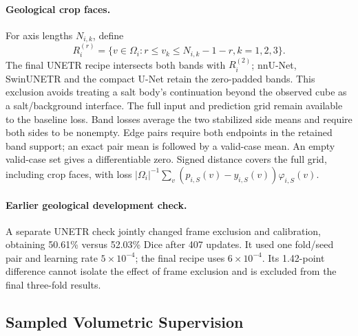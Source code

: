 \documentclass[12pt,a4paper]{article}
\begin{document}
\paragraph{Geological crop faces.}\label{sec:geo-boundaries}
For axis lengths $N_{i,k}$, define
\begin{equation}
R_i^{(r)}=\{v\in\Omega_i:r\leq v_k\leq N_{i,k}-1-r, k=1,2,3\}.
\label{eq:geological-band-frame}
\end{equation}
The final UNETR recipe intersects both bands with $R_i^{(2)}$;
nnU-Net, SwinUNETR and the compact U-Net retain the zero-padded bands.
This exclusion avoids treating a salt body's continuation beyond the
observed cube as a salt/background interface. The full input and
prediction grid remain available to the baseline loss.
Band losses average the two stabilized side means and require both
sides to be nonempty. Edge pairs require both endpoints in the retained
band support; an exact pair mean is followed by a valid-case mean.
An empty valid-case set gives a differentiable zero. Signed distance
covers the full grid, including crop faces, with loss
$|\Omega_i|^{-1}\sum_v(p_{i,S}(v)-y_{i,S}(v))\varphi_{i,S}(v)$.

\paragraph{Earlier geological development check.}\label{sec:geo-development}
A separate UNETR check jointly changed frame exclusion and calibration,
obtaining 50.61\% versus 52.03\% Dice after 407
updates. It used one fold/seed pair and learning rate $5\times10^{-4}$;
the final recipe uses $6\times10^{-4}$. Its 1.42-point difference
cannot isolate the effect of frame exclusion and is excluded from the
final three-fold results.

\subsection{Sampled Volumetric Supervision}
\label{sec:sampled-pretrained-supervision}
\end{document}
